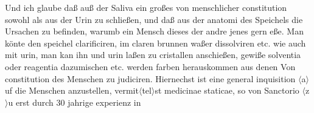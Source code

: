 Und ich glaube da{\ss} au{\ss} der Saliva\protect{} ein gro{\ss}es von menschlicher constitution\protect{} sowohl als aus der Urin\protect{} zu schlie{\ss}en, und da{\ss} aus der anatomi\protect{} des Speichels\protect{} die Ursachen zu befinden, warumb ein Mensch dieses der andre jenes gern e{\ss}e. Man k\"{o}nte den speichel\protect{} clarificiren, im claren brunnen wa{\ss}er dissolviren\protect{} etc. wie auch mit urin\protect{}, man kan ihn und urin\protect{} la{\ss}en zu cristallen\protect{} anschie{\ss}en, gewi{\ss}e solventia\protect{} oder reagentia\protect{} dazumischen etc. werden farben herauskommen aus denen Von constitution\protect{} des Menschen zu judiciren.
\pend%
\pstart%
Hiernechst ist eine general inquisition $\langle$a$\rangle$uf die Menschen anzustellen, vermit$\langle$tel$\rangle$st medicinae staticae, so von Sanctorio\protect{} $\langle$z$\rangle$u erst durch 30 jahrige experienz in%
